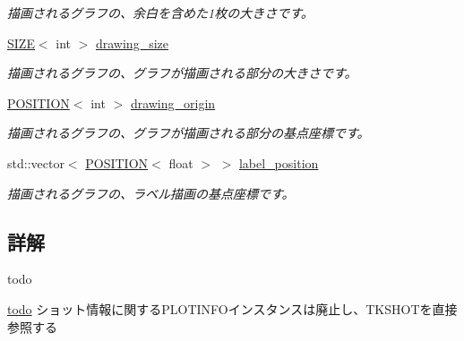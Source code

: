 \begin{DoxyCompactItemize}
\begin{DoxyCompactList}\small\item\em 描画されるグラフの、余白を含めた1枚の大きさです。 \end{DoxyCompactList}\item 
\mbox{\label{class_t_k_p_l_o_t_1_1_p_l_o_t_i_n_f_o_a27451bd9ddcd548bff9f91cdda6ed812}} 
\hyperlink{class_t_k_p_l_o_t_1_1_s_i_z_e}{S\+I\+ZE}$<$ int $>$ \hyperlink{class_t_k_p_l_o_t_1_1_p_l_o_t_i_n_f_o_a27451bd9ddcd548bff9f91cdda6ed812}{drawing\+\_\+size}
\begin{DoxyCompactList}\small\item\em 描画されるグラフの、グラフが描画される部分の大きさです。 \end{DoxyCompactList}\item 
\mbox{\label{class_t_k_p_l_o_t_1_1_p_l_o_t_i_n_f_o_ad5e1f688a044784cf24846d04fd48116}} 
\hyperlink{class_t_k_p_l_o_t_1_1_p_o_s_i_t_i_o_n}{P\+O\+S\+I\+T\+I\+ON}$<$ int $>$ \hyperlink{class_t_k_p_l_o_t_1_1_p_l_o_t_i_n_f_o_ad5e1f688a044784cf24846d04fd48116}{drawing\+\_\+origin}
\begin{DoxyCompactList}\small\item\em 描画されるグラフの、グラフが描画される部分の基点座標です。 \end{DoxyCompactList}\item 
\mbox{\label{class_t_k_p_l_o_t_1_1_p_l_o_t_i_n_f_o_a4266fd64b26c45e727843dc017ba2a3d}} 
std\+::vector$<$ \hyperlink{class_t_k_p_l_o_t_1_1_p_o_s_i_t_i_o_n}{P\+O\+S\+I\+T\+I\+ON}$<$ float $>$ $>$ \hyperlink{class_t_k_p_l_o_t_1_1_p_l_o_t_i_n_f_o_a4266fd64b26c45e727843dc017ba2a3d}{label\+\_\+position}
\begin{DoxyCompactList}\small\item\em 描画されるグラフの、ラベル描画の基点座標です。 \end{DoxyCompactList}\end{DoxyCompactItemize}


\subsection{詳解}
\begin{DoxyRefDesc}{todo}
\item[\hyperlink{todo__todo000004}{todo}]ショット情報に関する\+P\+L\+O\+T\+I\+N\+F\+Oインスタンスは廃止し、\+T\+K\+S\+H\+O\+Tを直接参照する \end{DoxyRefDesc}



